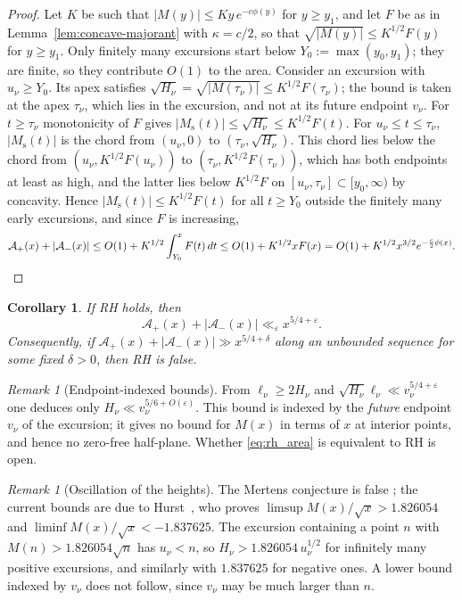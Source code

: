 \documentclass[11pt]{amsart}
\numberwithin{equation}{section}
\theoremstyle{plain}
\newtheorem{corollary}[theorem]{Corollary}
\theoremstyle{definition}
\theoremstyle{remark}
\newtheorem{remark}[theorem]{Remark}
\newcommand{\Ms}{M_{\mathrm{s}}}
\newcommand{\Ap}{\mathcal{A}_{+}}
\newcommand{\Am}{\mathcal{A}_{-}}
\newcommand{\eps}{\varepsilon}
\begin{document}
\begin{proof}
Let $K$ be such that $|M(y)|\le Ky\,e^{-c\phi(y)}$ for $y\ge y_1$, and let
$F$ be as in Lemma~\ref{lem:concave-majorant} with $\kappa=c/2$, so that
$\sqrt{|M(y)|}\le K^{1/2}F(y)$ for $y\ge y_1$. Only finitely many excursions
start below $Y_0:=\max(y_0,y_1)$; they are finite, so they contribute
$O(1)$ to the area. Consider an excursion with $u_\nu\ge Y_0$. Its apex
satisfies $\sqrt{H_\nu}=\sqrt{|M(\tau_\nu)|}\le K^{1/2}F(\tau_\nu)$; the
bound is taken at the apex $\tau_\nu$, which lies in the excursion, and not
at its future endpoint $v_\nu$. For $t\ge\tau_\nu$ monotonicity of $F$ gives
$|\Ms(t)|\le\sqrt{H_\nu}\le K^{1/2}F(t)$. For $u_\nu\le t\le\tau_\nu$,
$|\Ms(t)|$ is the chord from $(u_\nu,0)$ to $(\tau_\nu,\sqrt{H_\nu})$. This
chord lies below the chord from $(u_\nu,K^{1/2}F(u_\nu))$ to
$(\tau_\nu,K^{1/2}F(\tau_\nu))$, which has both endpoints at least as high,
and the latter lies below $K^{1/2}F$ on $[u_\nu,\tau_\nu]\subset[y_0,\infty)$
by concavity. Hence $|\Ms(t)|\le K^{1/2}F(t)$ for all $t\ge Y_0$ outside the
finitely many early excursions, and since $F$ is increasing,
\[
\Ap(x)+|\Am(x)|\le O(1)+K^{1/2}\int_{Y_0}^xF(t)\,dt
\le O(1)+K^{1/2}xF(x)=O(1)+K^{1/2}x^{3/2}e^{-\frac c2\phi(x)}.
\qedhere
\]
\end{proof}

\begin{corollary}
\label{cor:rh}
If RH holds, then
\begin{equation}
\label{eq:rh_area}
  \Ap(x)+|\Am(x)|\ll_\eps x^{5/4+\eps}.
\end{equation}
Consequently, if $\Ap(x)+|\Am(x)|\gg x^{5/4+\delta}$ along an unbounded
sequence for some fixed $\delta>0$, then RH is false.
\end{corollary}

\begin{remark}[Endpoint-indexed bounds]
\label{rem:onedirection}
From $\ell_\nu\ge2H_\nu$ and $\sqrt{H_\nu}\ell_\nu\ll v_\nu^{5/4+\eps}$ one
deduces only $H_\nu\ll v_\nu^{5/6+O(\eps)}$. This bound is indexed by the
\emph{future} endpoint $v_\nu$ of the excursion; it gives no bound for $M(x)$
in terms of $x$ at interior points, and hence no zero-free half-plane.
Whether \eqref{eq:rh_area} is equivalent to RH is open.
\end{remark}

\begin{remark}[Oscillation of the heights]
\label{rem:omega}
The Mertens conjecture is false \cite{OdlyzkoTeRiele1985,KotnikTeRiele2006};
the current bounds are due to Hurst~\cite{Hurst18}, who proves
$\limsup M(x)/\sqrt{x}>1.826054$ and
$\liminf M(x)/\sqrt{x}<-1.837625$. The excursion containing a point $n$ with
$M(n)>1.826054\sqrt n$ has $u_\nu<n$, so $H_\nu>1.826054\,u_\nu^{1/2}$ for
infinitely many positive excursions, and similarly with $1.837625$ for
negative ones. A lower bound indexed by $v_\nu$ does not follow, since
$v_\nu$ may be much larger than $n$.
\end{remark}
\end{document}
